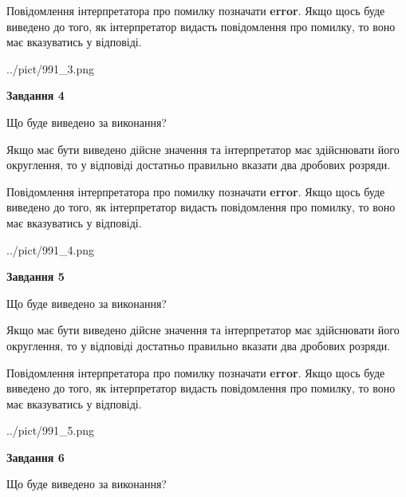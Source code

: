 \documentclass[12pt, ukrainian]{article}
\begin{document}
{\begin {Large}
Повідомлення інтерпретатора про помилку позначати \textbf{error}.
Якщо щось буде виведено до того, як інтерпретатор видасть повідомлення про помилку, 
то воно має вказуватись у відповіді. \par

\begin{center}
	{../pict/991_3.png}
\end{center}
\newpage

{\begin {center}\textbf{Завдання 4}\end {center}}\par
Що буде виведено за виконання? \par

Якщо має бути виведено дійсне значення та інтерпретатор має здійснювати його округлення, 
то у відповіді достатньо правильно вказати два дробових розряди.

Повідомлення інтерпретатора про помилку позначати \textbf{error}.
Якщо щось буде виведено до того, як інтерпретатор видасть повідомлення про помилку, 
то воно має вказуватись у відповіді. \par

\begin{center}
	{../pict/991_4.png}
\end{center}
\newpage

{\begin {center}\textbf{Завдання 5}\end {center}}\par
Що буде виведено за виконання? \par

Якщо має бути виведено дійсне значення та інтерпретатор має здійснювати його округлення, 
то у відповіді достатньо правильно вказати два дробових розряди.

Повідомлення інтерпретатора про помилку позначати \textbf{error}.
Якщо щось буде виведено до того, як інтерпретатор видасть повідомлення про помилку, 
то воно має вказуватись у відповіді. \par

\begin{center}
	{../pict/991_5.png}
\end{center}
\newpage

{\begin {center}\textbf{Завдання 6}\end {center}}\par
Що буде виведено за виконання? \par


\end{Large}}
\end{document}

